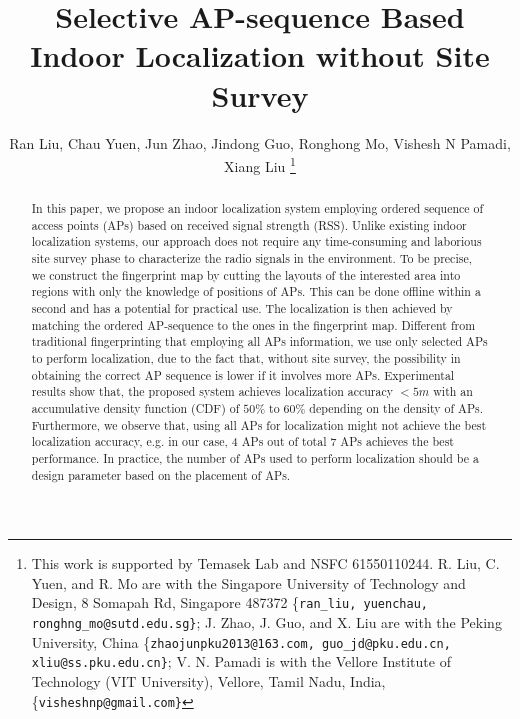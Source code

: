 \documentclass[10pt, conference, letterpaper]{IEEEtran}
\begin{document}
\IEEEoverridecommandlockouts
\title{Selective AP-sequence Based Indoor Localization without Site Survey}


\author{Ran Liu, Chau Yuen, Jun Zhao, Jindong Guo, Ronghong Mo, Vishesh N Pamadi, Xiang Liu
\thanks{This work is supported by Temasek Lab and NSFC 61550110244. \newline
R. Liu, C. Yuen, and R. Mo are with the Singapore University of Technology and Design, 8 Somapah Rd, Singapore 487372
{\{\tt\small ran\_liu, yuenchau, ronghng\_mo@sutd.edu.sg\}}; J. Zhao, J. Guo, and X. Liu are with the Peking University, China
{\{\tt\small  zhaojunpku2013@163.com, guo\_jd@pku.edu.cn, xliu@ss.pku.edu.cn\}};
V. N. Pamadi is with the Vellore Institute of Technology (VIT University), Vellore, Tamil Nadu, India,
{\{\tt\small  visheshnp@gmail.com\}}
}}



\maketitle

\begin{abstract}
In this paper, we propose an indoor localization system employing ordered sequence of access points (APs) based on received signal strength (RSS). 
Unlike existing indoor localization systems, our approach does not require any time-consuming and laborious site survey phase to characterize the radio signals in the environment. 
To be precise, we construct the fingerprint map by cutting the layouts of the interested area into regions with only the knowledge of positions of APs. 
This can be done offline within a second and has a potential for practical use. 
The localization is then achieved by matching the ordered AP-sequence to the ones in the fingerprint map.
Different from traditional fingerprinting that employing all APs information, 
we use only selected APs to perform localization, due to the fact that, without site survey, 
the possibility in obtaining the correct AP sequence is lower if it involves more APs.
Experimental results show that, the proposed system achieves localization accuracy $<5m$ with an accumulative density function (CDF) of $50\%$ to $60\%$ depending on the density of APs. 
Furthermore, we observe that, using all APs for localization might not achieve the best localization accuracy, e.g. in our case, $4$ APs out of total $7$ APs achieves the best performance. 
In practice, the number of APs used to perform localization should be a design parameter based on the placement of APs.
\end{abstract}
\end{document}
